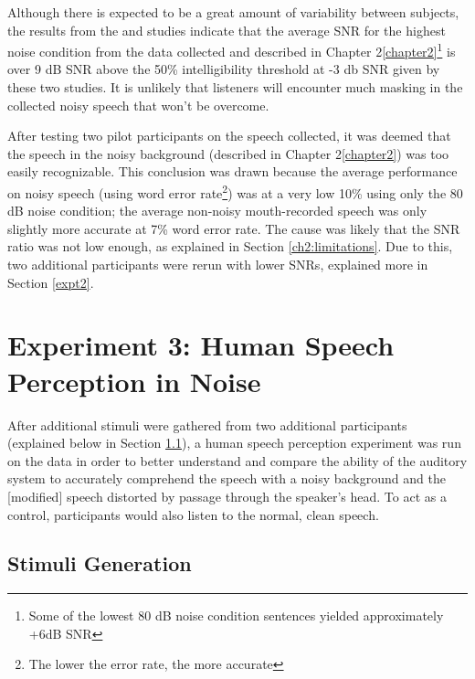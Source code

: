 \documentclass[dissertation,copyright]{uathesis}
\begin{document}
Although there is expected to be a great amount of variability between subjects, the results from the \cite{ding:13} and \cite{gilbert:13} studies indicate that the average SNR for the highest noise condition from the data collected and described in Chapter 2\ref{chapter2}\footnote{Some of the lowest 80 dB noise condition sentences yielded approximately +6dB SNR} is over 9 dB SNR above the 50\% intelligibility threshold at -3 db SNR given by these two studies.  It is unlikely that listeners will encounter much masking in the collected noisy speech that won't be overcome.

After testing two pilot participants on the speech collected, it was deemed that the speech in the noisy background (described in Chapter 2\ref{chapter2}) was too easily recognizable.  This conclusion was drawn because the average performance on noisy speech (using word error rate\footnote{The lower the error rate, the more accurate}) was at a very low 10\% using only the 80 dB noise condition; the average non-noisy mouth-recorded speech was only slightly more accurate at 7\% word error rate. The cause was likely that the SNR ratio was not low enough, as explained in Section \ref{ch2:limitations}.  Due to this, two additional participants were rerun with lower SNRs, explained more in Section \ref{expt2}.




\section{Experiment 3: Human Speech Perception in Noise}
\label{expt3}

After additional stimuli were gathered from two additional participants (explained below in Section \ref{chap4:methods:stimuli}), a human speech perception experiment was run on the data in order to better understand and compare the ability of the auditory system to accurately comprehend the speech with a noisy background and the [modified] speech distorted by passage through the speaker's head.  To act as a control, participants would also listen to the normal, clean speech.

\subsection{Stimuli Generation}
\label{chap4:methods:stimuli}
\end{document}
